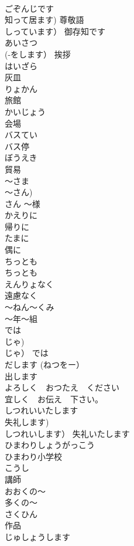 \documentclass[8pt]{extreport}
\begin{document}
\begin{CJK}{UTF8}{min}
\\	ごぞんじです	
\\	知って居ます) 尊敬語 
\\	しっています）	御存知です	
\\	あいさつ	
\\	(-をします）	挨拶	
\\	はいざら	
\\	灰皿	
\\	りょかん	
\\	旅館		
\\	かいじょう	
\\	会場	
\\	バスてい	
\\	バス停	
\\	ぼうえき	
\\	貿易	
\\	〜さま	
\\	〜さん) 
\\	さん	〜様		
\\	かえりに	
\\	帰りに		
\\	たまに	
\\	偶に	
\\	ちっとも	
\\	ちっとも		
\\	えんりょなく	
\\	遠慮なく	
\\	〜ねん〜くみ	
\\	〜年〜組		
\\	では	
\\	じゃ) 
\\	じゃ）	では		
\\	だします (ねつをー）	
\\	出します 
\\	よろしく　おつたえ　ください	
\\	宜しく　お伝え　下さい。		
\\	しつれいいたします	
\\	失礼します) 
\\	しつれいします）	失礼いたします		
\\	ひまわりしょうがっこう	
\\	ひまわり小学校		
\\	こうし	
\\	講師		
\\	おおくの〜	
\\	多くの〜		
\\	さくひん	
\\	作品		
\\	じゅしょうします	

\end{CJK}
\end{document}
